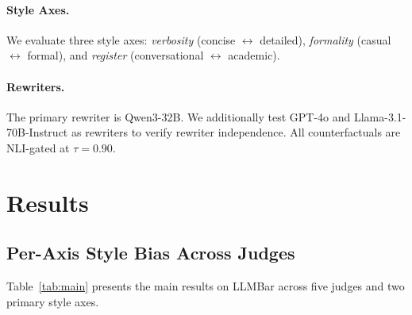 \documentclass[11pt]{article}
\begin{document}
\paragraph{Style Axes.}
We evaluate three style axes: \emph{verbosity} (concise $\leftrightarrow$ detailed), \emph{formality} (casual $\leftrightarrow$ formal), and \emph{register} (conversational $\leftrightarrow$ academic).

\paragraph{Rewriters.}
The primary rewriter is Qwen3-32B.
We additionally test GPT-4o and Llama-3.1-70B-Instruct as rewriters to verify rewriter independence.
All counterfactuals are NLI-gated at $\tau = 0.90$.

\section{Results}

\subsection{Per-Axis Style Bias Across Judges}

Table~\ref{tab:main} presents the main results on LLMBar across five judges and two primary style axes.
\end{document}
